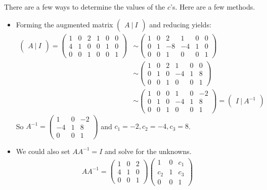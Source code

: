     \ifnum {} {\color{DarkBlue} \\[12pt] 
        There are a few ways to determine the values of the $c$'s. Here are a few methods. 
        \begin{itemize}
            \item Forming the augmented matrix $\begin{pmatrix}A \ | \ I\end{pmatrix}$ and reducing yields:
        \begin{align*}
            \begin{pmatrix}A \ | \ I\end{pmatrix} 
            = \begin{pmatrix} 1& 0 & 2 &1&0&0\\4&1&0&0&1&0\\0&0&1&0&0&1\end{pmatrix} 
            &\sim \begin{pmatrix} 1& 0 & 2 &1&0&0\\0&1&-8&-4&1&0\\0&0&1&0&0&1\end{pmatrix}\\
            &\sim \begin{pmatrix} 1& 0 & 2 &1&0&0\\0&1&0&-4&1&8\\0&0&1&0&0&1\end{pmatrix} \\
            &\sim \begin{pmatrix} 1& 0 & 0 &1&0&-2\\0&1&0&-4&1&8\\0&0&1&0&0&1\end{pmatrix}  = \begin{pmatrix}I \ | \ A^{-1}\end{pmatrix} 
        \end{align*}
        So $A^{-1} = \begin{pmatrix} 1&0&-2\\-4&1&8\\0&0&1\end{pmatrix}$ and $c_1 = -2, c_2 = -4, c_3 = 8$. 
        \item We could also set $AA^{-1} = I$ and solve for the unknowns. 
        \begin{align}
            AA^{-1} = \begin{pmatrix} 1& 0 & 2 \\4&1&0\\0&0&1\end{pmatrix}\begin{pmatrix} 1&0&c_1\\c_2&1&c_3\\0&0&1\end{pmatrix}

\end{align}
\end{itemize}}
